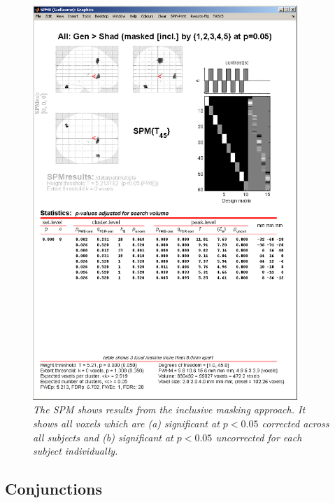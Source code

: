 \begin{figure}
\begin{center}
\includegraphics[width=100mm]{pet/masked_res}
\caption{\em The SPM shows results from the inclusive masking approach. It shows all voxels which are (a) significant at $p<0.05$ corrected across all subjects and (b) significant at $p<0.05$ uncorrected for each subject individually. \label{masked_res}}
\end{center}
\end{figure}

\subsection{Conjunctions}

